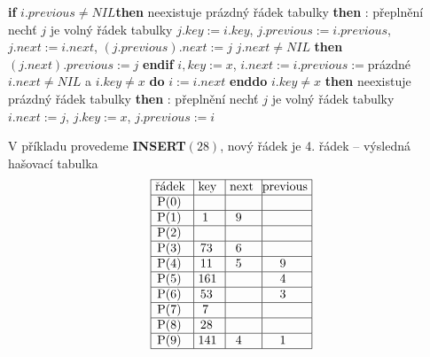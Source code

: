 \documentclass[a4paper,12pt]{article}
\begin{document}
{\bf if} $i.previous\ne NIL${\bf then}\newline 
\phantom{---}{\bf if} neexistuje prázdný řádek tabulky {\bf then}\newline 
\phantom{------}{\bf Výstup}: přeplnění\newline 
\phantom{---}{\bf else}\newline 
\phantom{------}nech\v t $j$ je volný řádek tabulky\newline 
\phantom{------}$j.key:=i.key$, $j.previous:=i.previous$, $j.next:=i.next$, $(j.previous).next:=j$\newline 
\phantom{------}{\bf if} $j.next\ne NIL$ {\bf then} $(j.next).previous:=j$ {\bf endif}\newline 
\phantom{---------}$i,key:=x$, $i.next:=i.previous:=$prázdné\newline 
\phantom{------}{\bf endif}\newline 
\phantom{---}{\bf endif\newline 
else}\newline 
\phantom{---}{\bf while} $i.next\ne NIL$ a $i.key\ne x$ {\bf do} $i:=i.next$ {\bf enddo}\newline 
\phantom{---}{\bf if} $i.key\ne x$ {\bf then}\newline 
\phantom{------}{\bf if} neexistuje prázdný řádek tabulky {\bf then}\newline 
\phantom{---------}{\bf Výstup}: přeplnění\newline 
\phantom{------}{\bf else}\newline 
\phantom{---------}nech\v t $j$ je volný řádek tabulky\newline 
\phantom{---------}$i.next:=j$, $j.key:=x$, $j.previous:=i$\newline 
\phantom{------}{\bf endif}\newline 
\phantom{---}{\bf endif\newline
endif}
\bigskip

V příkladu provedeme {\bf INSERT$(28)$}, nový řádek je 4. řádek\newline 
-- výsledná hašovací tabulka
$$\vtop{\offinterlineskip\halign {\strut\vrule\ # & \vrule\ # & \vrule\ # & \vrule \hfil # \hfil \vrule\cr\noalign{\hrule}řádek & key & next & previous\hfil \cr\noalign{\hrule}P(0) & & &\hfill \cr\noalign{\hrule}P(1) & 1 & 9 &\hfill \cr\noalign{\hrule}P(2) & & &\hfill \cr\noalign{\hrule}P(3) & 73 & 6 &\hfill \cr\noalign{\hrule}P(4) & 11 & 5 & 9 \cr\noalign{\hrule}P(5) & 161 & & 4 \cr\noalign{\hrule}P(6) & 53 & & 3 \cr\noalign{\hrule}P(7) & 7 & &\hfill \cr\noalign{\hrule}P(8) & 28 &  &\hfill  \cr\noalign{\hrule}P(9) & 141 & 4 & 1 \cr\noalign{\hrule}}}$$
\end{document}
